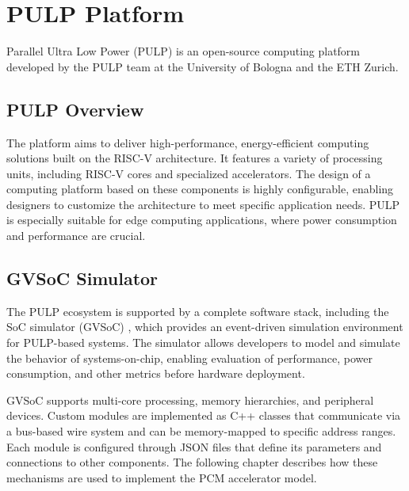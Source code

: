 \section{PULP Platform}\label{sec:pulp}
Parallel Ultra Low Power (PULP) is an open-source computing platform developed by the PULP team at the University of Bologna and the ETH Zurich.

\subsection{PULP Overview}\label{sec:pulp_ov}%
The platform aims to deliver high-performance, energy-efficient computing solutions built on the RISC-V architecture.
It features a variety of processing units, including RISC-V cores and specialized accelerators. The design of a computing platform based on these components is highly configurable, enabling designers to customize the architecture to meet specific application needs.
PULP is especially suitable for edge computing applications, where power consumption and performance are crucial.

\subsection{GVSoC Simulator}\label{sec:gvsoc}

The PULP ecosystem is supported by a complete software stack, including the 
SoC simulator (GVSoC) \cite{bruschi_gvsoc_2021}, which provides an event-driven simulation 
environment for PULP-based systems. The simulator allows developers to model 
and simulate the behavior of systems-on-chip, enabling evaluation of 
performance, power consumption, and other metrics before hardware deployment. 

GVSoC supports multi-core processing, memory hierarchies, and peripheral devices. 
Custom modules are implemented as C++ classes that communicate via a bus-based 
wire system and can be memory-mapped to specific address ranges. Each module is 
configured through JSON files that define its parameters and connections to other 
components. The following chapter describes how these mechanisms are used to 
implement the PCM accelerator model.
